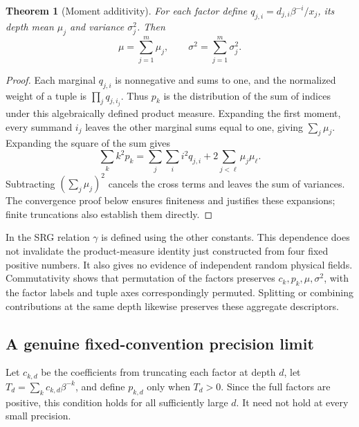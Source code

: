 \documentclass[11pt,a4paper]{article}
\newtheorem{theorem}{Theorem}[section]
\begin{document}
\begin{theorem}[Moment additivity]
For each factor define $q_{j,i}=d_{j,i}\beta^{-i}/x_j$, its depth mean $\mu_j$ and variance $\sigma_j^2$. Then
\begin{equation}
 \mu=\sum_{j=1}^m\mu_j,\qquad
 \sigma^2=\sum_{j=1}^m\sigma_j^2.
 \label{eq:moments}
\end{equation}
\end{theorem}
\begin{proof}
Each marginal $q_{j,i}$ is nonnegative and sums to one, and the normalized weight of a tuple is $\prod_jq_{j,i_j}$. Thus $p_k$ is the distribution of the sum of indices under this algebraically defined product measure. Expanding the first moment, every summand $i_j$ leaves the other marginal sums equal to one, giving $\sum_j\mu_j$. Expanding the square of the sum gives
\[
 \sum_k k^2p_k
 =\sum_j\sum_i i^2q_{j,i}+2\sum_{j<\ell}\mu_j\mu_\ell.
\]
Subtracting $(\sum_j\mu_j)^2$ cancels the cross terms and leaves the sum of variances. The convergence proof below ensures finiteness and justifies these expansions; finite truncations also establish them directly.
\end{proof}
In the SRG relation $\gamma$ is defined using the other constants. This dependence does not invalidate the product-measure identity just constructed from four fixed positive numbers. It also gives no evidence of independent random physical fields. Commutativity shows that permutation of the factors preserves $c_k,p_k,\mu,\sigma^2$, with the factor labels and tuple axes correspondingly permuted. Splitting or combining contributions at the same depth likewise preserves these aggregate descriptors.

\subsection{A genuine fixed-convention precision limit}
Let $c_{k,d}$ be the coefficients from truncating each factor at depth $d$, let $T_d=\sum_kc_{k,d}\beta^{-k}$, and define $p_{k,d}$ only when $T_d>0$. Since the full factors are positive, this condition holds for all sufficiently large $d$. It need not hold at every small precision.
\end{document}

